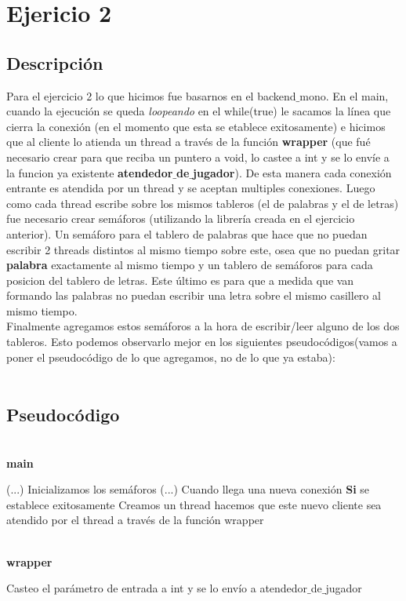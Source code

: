 \section{Ejericio 2}
\subsection{Descripción}
Para el ejercicio 2 lo que hicimos fue basarnos en el backend$\_$mono. En el main, cuando la ejecución se queda  \textit{loopeando} en el while(true) le sacamos la línea que cierra la conexión (en el momento que esta se etablece exitosamente) e hicimos que al cliente lo atienda un thread a través de la función \textbf{wrapper} (que fué necesario crear para que reciba un puntero a void, lo castee a int y se lo envíe a la funcion ya existente \textbf{atendedor$\_$de$\_$jugador}). De esta manera cada conexión entrante es atendida por un thread y se aceptan multiples conexiones. Luego como cada thread escribe sobre los mismos tableros (el de palabras y el de letras) fue necesario crear semáforos (utilizando la librería creada en el ejercicio anterior). Un semáforo para el tablero de palabras que hace que no puedan escribir 2 threads distintos al mismo tiempo sobre este, osea que no puedan gritar  \textbf{palabra} exactamente al mismo tiempo y un tablero de semáforos para cada posicion del tablero de letras. Este último es para que a medida que van formando las palabras no puedan escribir una letra sobre el mismo casillero al mismo tiempo. \\
Finalmente agregamos estos semáforos a la hora de escribir/leer alguno de los dos tableros. Esto podemos observarlo mejor en los siguientes pseudocódigos(vamos a poner el pseudocódigo de lo que agregamos, no de lo que ya estaba):\\
\\

\subsection{Pseudocódigo}
\mbox{}\\
\textbf {main}
\begin{codebox}
\li (...)
\li Inicializamos los semáforos
\li (...)
\li Cuando llega una nueva conexión 
\li \textbf{Si} se establece exitosamente \Do
\li	Creamos un thread
\li	hacemos que este nuevo cliente sea atendido por el thread a través de la función wrapper \End
\end{codebox}


\mbox{}\\
\textbf {wrapper}
\begin{codebox}
\li Casteo el parámetro de entrada a int y se lo envío a atendedor$\_$de$\_$jugador
\end{codebox}

